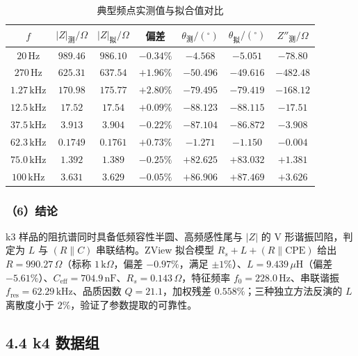 \documentclass[12pt,a4paper]{ctexart}
\begin{document}
\begin{table}[htbp]\centering\small
\caption{典型频点实测值与拟合值对比}\label{tab:k3_pts}
\begin{tabular}{c|c|c|c|c|c|c}
\hline
$f$ & $|Z|_{\text{测}}/\Omega$ & $|Z|_{\text{拟}}/\Omega$ & 偏差 & $\theta_{\text{测}}/(^\circ)$ & $\theta_{\text{拟}}/(^\circ)$ & $Z''_{\text{测}}/\Omega$ \\
\hline
$20\,\mathrm{Hz}$ & $989.46$ & $986.10$ & $-0.34\%$ & $-4.568$ & $-5.051$ & $-78.80$ \\
$270\,\mathrm{Hz}$ & $625.31$ & $637.54$ & $+1.96\%$ & $-50.496$ & $-49.616$ & $-482.48$ \\
$1.27\,\mathrm{kHz}$ & $170.98$ & $175.77$ & $+2.80\%$ & $-79.495$ & $-79.419$ & $-168.12$ \\
$12.5\,\mathrm{kHz}$ & $17.52$ & $17.54$ & $+0.09\%$ & $-88.123$ & $-88.115$ & $-17.51$ \\
$37.5\,\mathrm{kHz}$ & $3.913$ & $3.904$ & $-0.22\%$ & $-87.104$ & $-86.872$ & $-3.908$ \\
$62.3\,\mathrm{kHz}$ & $0.1749$ & $0.1761$ & $+0.73\%$ & $-1.271$ & $-1.150$ & $-0.004$ \\
$75.0\,\mathrm{kHz}$ & $1.392$ & $1.389$ & $-0.25\%$ & $+82.625$ & $+83.032$ & $+1.381$ \\
$100\,\mathrm{kHz}$ & $3.631$ & $3.629$ & $-0.05\%$ & $+86.906$ & $+87.469$ & $+3.626$ \\
\hline
\end{tabular}
\end{table}

\subsubsection*{（6）结论}
k3 样品的阻抗谱同时具备低频容性半圆、高频感性尾与 $|Z|$ 的 V 形谐振凹陷，判定为 $L$ 与 $(R\parallel C)$ 串联结构。ZView 拟合模型 $R_s+L+(R\parallel\mathrm{CPE})$ 给出 $R=990.27\,\Omega$（标称 $1\,\mathrm{k}\Omega$，偏差 $-0.97\%$，满足 $\pm1\%$）、$L=9.439\,\mu\mathrm{H}$（偏差 $-5.61\%$）、$C_{\mathrm{eff}}=704.9\,\mathrm{nF}$、$R_s=0.143\,\Omega$，特征频率 $f_0=228.0\,\mathrm{Hz}$、串联谐振 $f_{\mathrm{res}}=62.29\,\mathrm{kHz}$、品质因数 $Q=21.1$，加权残差 $0.558\%$；三种独立方法反演的 $L$ 离散度小于 $2\%$，验证了参数提取的可靠性。

\subsection*{4.4 k4 数据组}
\end{document}
